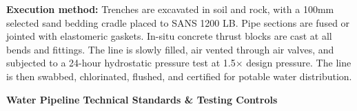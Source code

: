 \noindent
\begin{minipage}[t]{0.185\textwidth}\end{minipage}\hfill
\begin{minipage}[t]{0.185\textwidth}\end{minipage}\hfill
\begin{minipage}[t]{0.185\textwidth}\end{minipage}\hfill
\begin{minipage}[t]{0.185\textwidth}\end{minipage}\hfill
\begin{minipage}[t]{0.185\textwidth}\end{minipage}

\vspace{0.20cm}

\noindent
\begin{tcolorbox}[enhanced, colback=mhoffwhite, colframe=mhlightgray, boxrule=0.7pt, arc=4pt, left=9pt, right=9pt, top=7pt, bottom=7pt, borderline west={3pt}{0pt}{mhgold}, drop shadow=black!4]
    {\fontsize{8.1pt}{11.0pt}\selectfont\color{mhtext}
    \textbf{Execution method:} Trenches are excavated in soil and rock, with a 100mm selected sand bedding cradle placed to SANS 1200 LB. Pipe sections are fused or jointed with elastomeric gaskets. In-situ concrete thrust blocks are cast at all bends and fittings. The line is slowly filled, air vented through air valves, and subjected to a 24-hour hydrostatic pressure test at 1.5$\times$ design pressure. The line is then swabbed, chlorinated, flushed, and certified for potable water distribution.
    }
\end{tcolorbox}

\vfill

\noindent
{\large\bfseries\color{mhnavy} Water Pipeline Technical Standards \& Testing Controls}
\vspace{0.10cm}

